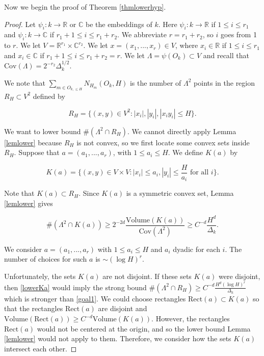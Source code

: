\documentclass{amsart}
\newcommand{\CC}{\mathbb{C}}
\newcommand{\RR}{\mathbb{R}}
\newcommand{\Volume}{\textrm{Volume}}
\newcommand{\Cov}{\textrm{Cov}}
\newcommand{\Rect}{\textrm{Rect}}
\begin{document}
Now we begin the proof of Theorem \ref{thmlowerhyp}. 

\begin{proof}
Let $\psi_i: k \rightarrow \RR$ or $\CC$ be the embeddings of $k$.  Here $\psi_i: k \rightarrow \RR$ if $1 \le i \le r_1$ and $\psi_i: k \rightarrow \CC$ if $r_1 + 1 \le i \le r_1 + r_2$.  We abbreviate $r = r_1 + r_2$, so $i$ goes from 1 to $r$.  We let $V = \RR^{r_1} \times \CC^{r_2}$.  We let $x = (x_1, ..., x_r) \in V$, where $x_i \in \RR$ if $1 \le i \le r_1$ and $x_i \in \CC$ if $r_1 + 1 \le i \le r_1 + r_2 = r$.  We let $\Lambda = \psi(O_k) \subset V$ and recall that $\Cov(\Lambda) = 2^{-r_2} \Delta_k^{1/2}$.

We note that $\sum_{m \in O_{k, \le H}} N_{H_m}(O_k, H)$ is the number of $\Lambda^2$ points in the region $R_H \subset V^2$ defined by

\begin{equation} \label{defRHrig}
R_H = \{ (x,y) \in V^2: |x_i|, |y_i|, |x_i y_i| \le H \}. 
\end{equation}

We want to lower bound $\# (\Lambda^2 \cap R_H)$.  We cannot directly apply Lemma \ref{lemlower} because $R_H$ is not convex, so we first locate some convex sets inside $R_H$.  Suppose that $a = (a_1, ..., a_r)$, with $1 \le a_i \le H$.  We define $K(a)$ by

$$ K(a) = \{ (x,y) \in V \times V: |x_i| \le a_i, |y_i| \le \frac{H}{a_i} \textrm{ for all } i \}. $$

Note that $K(a) \subset R_H$.  Since $K(a)$ is a symmetric convex set, Lemma \ref{lemlower} gives

\begin{equation} \label{lowerKa}
\# (\Lambda^2 \cap K(a) ) \ge 2^{-2d} \frac{ \Volume (K(a))}{\Cov(\Lambda^2)} \ge C^{-d} \frac{ H^d}{\Delta_k} .
\end{equation}

We consider $a = (a_1, ..., a_r)$ with $1 \le a_i \le H$ and $a_i$ dyadic for each $i $.  The number of choices for such $a$ is $\sim (\log H)^r$.  

Unfortunately, the sets $K(a)$ are not disjoint.  If these sets $K(a)$ were disjoint, then \eqref{lowerKa} would imply the strong bound $\# (\Lambda^2 \cap R_H) \ge C^{-d} \frac{ H^d (\log H)^r}{\Delta_k}$ which is stronger than \eqref{goal1}.  We could choose rectangles $\Rect(a) \subset K(a)$ so that the rectangles $\Rect(a)$ are disjoint and $\Volume(\Rect(a)) \ge C^{-d} \Volume (K(a))$.  However, the rectangles $\Rect(a)$ would not be centered at the origin, and so  the lower bound Lemma \ref{lemlower} would not apply to them.  Therefore, we consider how the sets $K(a)$ intersect each other.  


\end{proof}
\end{document}
